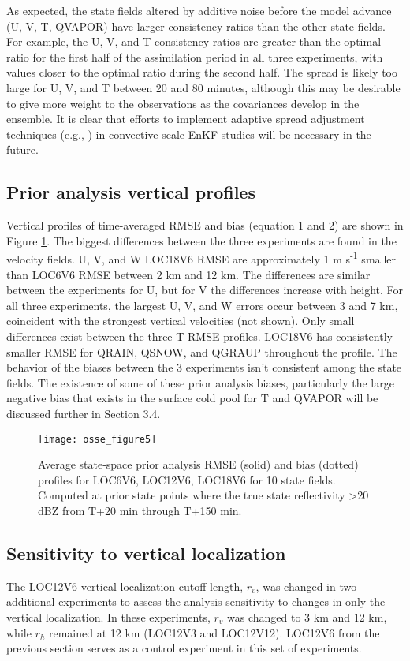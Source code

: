 As expected, the state fields altered by additive noise before the model advance (U, V, T, QVAPOR) have larger consistency ratios than the other state fields. For example, the U, V, and T consistency ratios are greater than the optimal ratio for the first half of the assimilation period in all three experiments, with values closer to the optimal ratio during the second half. The spread is likely too large for U, V, and T between 20 and 80 minutes, although this may be desirable to give more weight to the observations as the covariances develop in the ensemble. It is clear that efforts to implement adaptive spread adjustment techniques (e.g., \citealt{anderson09}) in convective-scale EnKF studies will be necessary in the future.

\subsection{Prior analysis vertical profiles}
Vertical profiles of time-averaged RMSE and bias (equation 1 and 2) are shown in Figure \ref{osse_fig5}. The biggest differences between the three experiments are found in the velocity fields. U, V, and W LOC18V6 RMSE are approximately 1 m s\textsuperscript{-1} smaller than LOC6V6 RMSE between 2 km and 12 km. The differences are similar between the experiments for U, but for V the differences increase with height. For all three experiments, the largest U, V, and W errors occur between 3 and 7 km, coincident with the strongest vertical velocities (not shown). Only small differences exist between the three T RMSE profiles. LOC18V6 has consistently smaller RMSE for QRAIN, QSNOW, and QGRAUP throughout the profile. The behavior of the biases between the 3 experiments isn’t consistent among the state fields. The existence of some of these prior analysis biases, particularly the large negative bias that exists in the surface cold pool for T and QVAPOR will be discussed further in Section 3.4.

\begin{figure}
\centering
\texttt{[image: osse\_figure5]}
\caption{Average state-space prior analysis RMSE (solid) and bias (dotted) profiles for LOC6V6, LOC12V6, LOC18V6 for 10 state fields. Computed at prior state points where the true state reflectivity \textgreater 20 dBZ from T+20 min through T+150 min.}
\label{osse_fig5}
\end{figure}

\subsection{Sensitivity to vertical localization}
The LOC12V6 vertical localization cutoff length, \(r_v\), was changed in two additional experiments to assess the analysis sensitivity to changes in only the vertical localization.  In these experiments, \(r_v\) was changed to 3 km and 12 km, while \(r_h\) remained at 12 km (LOC12V3 and LOC12V12). LOC12V6 from the previous section serves as a control experiment in this set of experiments.

